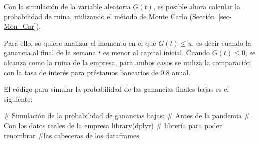 \documentclass[
  us-letterpaper,
]{scrreprt}
\newenvironment{Shaded}{\begin{snugshade}}{\end{snugshade}}
\newcommand{\CommentTok}[1]{\textcolor[rgb]{0.37,0.37,0.37}{#1}}
\newcommand{\FunctionTok}[1]{\textcolor[rgb]{0.28,0.35,0.67}{#1}}
\newcommand{\NormalTok}[1]{\textcolor[rgb]{0.00,0.23,0.31}{#1}}
\theoremstyle{plain}
\theoremstyle{plain}
\theoremstyle{definition}
\theoremstyle{remark}
\begin{document}
Con la simulación de la variable aleatoria \(G(t)\), es posible ahora
calcular la probabilidad de ruina, utilizando el método de Monte Carlo
(Sección~\ref{sec-Mon_Car}).

Para ello, se quiere analizar el momento en el que \(G(t)\leq u\), es
decir cuando la ganancia al final de la semana \(t\) es menor al capital
inicial. Cuando \(G(t)\leq0\), se alcanza como la ruina de la empresa,
para ambos casos se utiliza la comparación con la tasa de interés para
préstamos bancarios de \(0.8\) anual.

El código para simular la probabilidad de las ganancias finales bajas es
el siguiente:

\begin{Shaded}
\begin{Highlighting}[]
\CommentTok{\# Simulación de la probabilidad de ganancias bajas: }
\CommentTok{\# Antes de la pandemia}
\CommentTok{\# Con los datos reales de la empresa}
\FunctionTok{library}\NormalTok{(dplyr) }\CommentTok{\# librería para poder renombrar }
\CommentTok{\#las cabeceras de los dataframes}


\end{Highlighting}
\end{Shaded}
\end{document}
